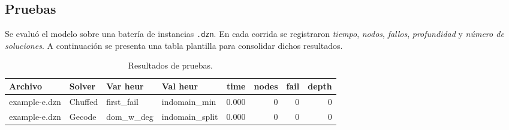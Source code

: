 
\subsection{Pruebas}\label{sec:01-sudoku-pruebas}
Se evaluó el modelo sobre una batería de instancias \texttt{.dzn}. En cada corrida se registraron \emph{tiempo}, \emph{nodos}, \emph{fallos}, \emph{profundidad} y \emph{número de soluciones}. A continuación se presenta una tabla plantilla para consolidar dichos resultados.

\begin{table}[!htbp]
  \centering
  \small
  \setlength{\tabcolsep}{2.8pt}
  \caption{Resultados de pruebas.}
  \label{tab:pruebas-sudoku}
  \begin{tabular}{l l l l r r r r}
    \toprule
    \textbf{Archivo} & \textbf{Solver} & \textbf{Var heur} & \textbf{Val heur} & \textbf{time} & \textbf{nodes} & \textbf{fail} & \textbf{depth} \\
    \midrule
    example-e.dzn & Chuffed & first\_fail  & indomain\_min   & 0.000 & 0 & 0 & 0 \\
    example-e.dzn & Gecode  & dom\_w\_deg  & indomain\_split & 0.000 & 0 & 0 & 0 \\
    \bottomrule
  \end{tabular}
\end{table}

